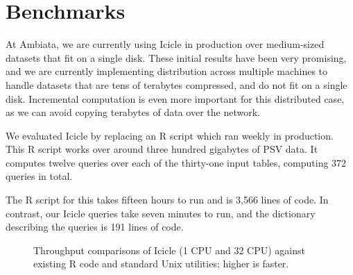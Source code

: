 \section{Benchmarks}
\label{s:Benchmarks}

At Ambiata, we are currently using Icicle in production over medium-sized datasets that fit on a single disk.
These initial results have been very promising, and we are currently implementing distribution across multiple machines to handle datasets that are tens of terabytes compressed, and do not fit on a single disk.
Incremental computation is even more important for this distributed case, as we can avoid copying terabytes of data over the network.

We evaluated Icicle by replacing an R script which ran weekly in production.
This R script works over around three hundred gigabytes of PSV data.
It computes twelve queries over each of the thirty-one input tables, computing 372 queries in total.

The R script for this takes fifteen hours to run and is 3,566 lines of code.
In contrast, our Icicle queries take seven minutes to run, and the dictionary describing the queries is 191 lines of code.

\begin{figure}


\caption{Throughput comparisons of Icicle (1 CPU and 32 CPU) against existing R code and standard Unix utilities; higher is faster.}
\label{fig:bench:other}
\end{figure}


